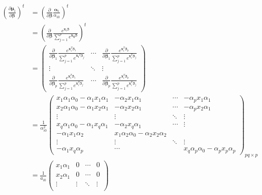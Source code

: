 \documentclass{article}
\begin{document}
\begin{align*}
  \left(\frac{\partial  \boldsymbol\mu_i }{\partial \boldsymbol\beta}\right)^t &= \left(\frac{\partial  }{\partial \boldsymbol \beta} \frac{\boldsymbol\alpha_{i}}{\alpha_{i0}} \right)^t\\
  &= \left(\frac{\partial  }{\partial \boldsymbol \beta} \frac{e^{\mathbf{x}_i \boldsymbol\beta}}{\sum_{j = 1}^pe^{\mathbf{x_{ij}}\boldsymbol\beta}} \right)^t\\
  &= \begin{pmatrix}
        \frac{\partial }{\partial \boldsymbol\beta_1}\frac{e^{\mathbf{x}_i^T \boldsymbol\beta_1}}{\sum_{j = 1}^pe^{\mathbf{x_i}^T \boldsymbol\beta_j}} & \cdots & \frac{\partial  }{\partial \boldsymbol\beta_1}\frac{e^{\mathbf{x}_i^T \boldsymbol\beta_p}}{\sum_{j = 1}^pe^{\mathbf{x}_i^T \boldsymbol\beta_j}}\\
        \vdots & \ddots & \vdots \\
        \frac{\partial  }{\partial \boldsymbol\beta_p}\frac{e^{\mathbf{x}_i^T \boldsymbol\beta_1}}{\sum_{j = 1}^pe^{\mathbf{x}_i^T \boldsymbol\beta_j}} & \cdots & \frac{\partial  }{\partial \boldsymbol\beta_p}\frac{e^{\mathbf{x}_i^T \boldsymbol\beta_p}}{\sum_{j = 1}^pe^{\mathbf{x}_i^T \boldsymbol\beta_j}}
  \end{pmatrix}\\
  &= \frac{1}{\alpha_{i0}^2} \begin{pmatrix} x_1 \alpha_1 \alpha_0 - \alpha_1 x_1 \alpha_1 & - \alpha_2 x_1 \alpha_1 & \cdots & - \alpha_p x_1 \alpha_1 \\
x_2 \alpha_1 \alpha_0 - \alpha_1 x_2 \alpha_1 & - \alpha_2 x_2 \alpha_1 & \cdots & -\alpha_p x_2 \alpha_1 \\
\vdots & \vdots &  \ddots & \vdots \\
x_q\alpha_1\alpha_0 - \alpha_1 x_q\alpha_1 & - \alpha_2 x_q \alpha_1 &  \cdots  & \vdots  \\
- \alpha_1x_1\alpha_2 & x_1 \alpha_2\alpha_0 - \alpha_2 x_2\alpha_2 &   & \\
\vdots & \vdots & \ddots & \vdots \\
- \alpha_1x_q\alpha_p & \cdots  & & x_q\alpha_p\alpha_0 - \alpha_px_p\alpha_p
\end{pmatrix}_{pq \times p}\\
&= \frac{1}{a_{i0}} \begin{pmatrix}x_1 \alpha_1 & 0 & \cdots & 0 \\
x_2 \alpha_1 & 0 & \cdots & 0 \\
\vdots & \vdots & \ddots & \vdots \\

\end{pmatrix}
\end{align*}
\end{document}
